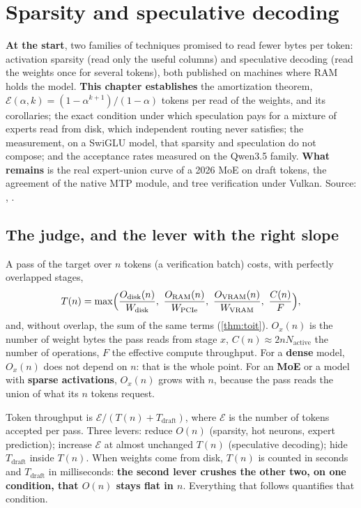 \chapter{Sparsity and speculative decoding}\label{ch:sparsite}

\begin{origine}
\textbf{At the start}, two families of techniques promised to read fewer bytes per token: activation sparsity (read only the useful columns) and speculative decoding (read the weights once for several tokens), both published on machines where RAM holds the model.
\textbf{This chapter establishes} the amortization theorem, $\mathcal E(\alpha,k) = (1-\alpha^{k+1})/(1-\alpha)$ tokens per read of the weights, and its corollaries; the exact condition under which speculation pays for a mixture of experts read from disk, which independent routing never satisfies; the measurement, on a SwiGLU model, that sparsity and speculation do not compose; and the acceptance rates measured on the Qwen3.5 family.
\textbf{What remains} is the real expert-union curve of a 2026 MoE on draft tokens, the agreement of the native MTP module, and tree verification under Vulkan.
Source: , .
\end{origine}

\section{The judge, and the lever with the right slope}\label{sec:spec-juge}

A pass of the target over $n$ tokens (a verification batch) costs, with perfectly overlapped stages,
\begin{equation}\label{eq:passe}
T(n) = \max\Bigl( \frac{O_{\mathrm{disk}}(n)}{W_{\mathrm{disk}}},\ \frac{O_{\mathrm{RAM}}(n)}{W_{\mathrm{PCIe}}},\ \frac{O_{\mathrm{VRAM}}(n)}{W_{\mathrm{VRAM}}},\ \frac{C(n)}{F} \Bigr),
\end{equation}
and, without overlap, the sum of the same terms (\cref{thm:toit}). $O_x(n)$ is the number of weight bytes the pass reads from stage $x$, $C(n) \approx 2 n N_{\text{active}}$ the number of operations, $F$ the effective compute throughput. For a \textbf{dense} model, $O_x(n)$ does not depend on $n$: that is the whole point. For an \textbf{MoE} or a model with \textbf{sparse activations}, $O_x(n)$ grows with $n$, because the pass reads the union of what its $n$ tokens request.

Token throughput is $\mathcal E / (T(n) + T_{\text{draft}})$, where $\mathcal E$ is the number of tokens accepted per pass. Three levers: reduce $O(n)$ (sparsity, hot neurons, expert prediction); increase $\mathcal E$ at almost unchanged $T(n)$ (speculative decoding); hide $T_{\text{draft}}$ inside $T(n)$. When weights come from disk, $T(n)$ is counted in seconds and $T_{\text{draft}}$ in milliseconds: \textbf{the second lever crushes the other two, on one condition, that $O(n)$ stays flat in $n$}. Everything that follows quantifies that condition.

